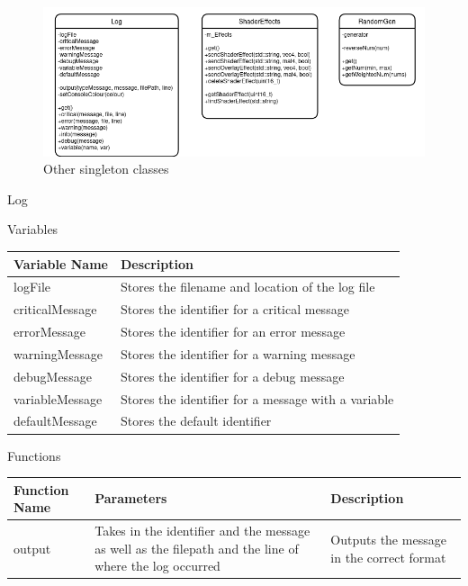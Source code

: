 \documentclass[../../Main.tex]{subfiles}
\begin{document}
    \begin{figure}[hbt!]
        \centerline{\includegraphics[scale=0.5]{img/Classes/Singletons.png}}
        \caption{Other singleton classes}
        \label{fig}
    \end{figure}
    Log
    \begin{center}
        Variables
        \begin{tabular}{ | m{} | m{} | }
            \hline
            \textbf{Variable Name} & \textbf{Description} \\
            \hline
            logFile & Stores the filename and location of the log file \\
            \hline
            criticalMessage & Stores the identifier for a critical message \\
            \hline
            errorMessage & Stores the identifier for an error message \\
            \hline
            warningMessage & Stores the identifier for a warning message \\
            \hline
            debugMessage & Stores the identifier for a debug message \\
            \hline
            variableMessage & Stores the identifier for a message with a variable \\
            \hline
            defaultMessage & Stores the default identifier \\
            \hline
        \end{tabular}
        Functions
        \begin{tabular}{ | m{} | m{}| m{} | }
            \hline
            \textbf{Function Name} & \textbf{Parameters} & \textbf{Description} \\
            \hline
            output & Takes in the identifier and the message as well as the filepath and the line of where the log occurred & Outputs the message in the correct format \\

\end{tabular}
\end{center}
\end{document}
